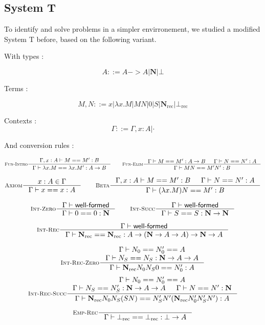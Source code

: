 \documentclass[11pt]{article}
\DeclareMathOperator{\rec}{rec}
\newcommand{\0}{\mathbf{0}}
\newcommand{\1}{\mathbf{1}}
\newcommand{\nat}{\mathbf{N}}
\newcommand{\tctx}{\Gamma}
\newcommand{\Wf}{\textsf{well-formed}}
\begin{document}


\subsection{System T}

To identify and solve problems in a simpler envirronement, we studied a modified System T before, based on the following variant.

With types :

$$ A ::= A -> A | \nat | \bot $$

Terms :

$$ M,N ::= x | \lambda x. M | MN | 0 | S | \nat_{\rec} | \bot_{\rec} $$


Contexts :
$$ \tctx ::= \tctx, x : A | \cdot $$

And conversion rules :


$$
    \inference[\textsc{Fun-Intro}]{\tctx, x : A |- M == M' : B }{\tctx |- \lambda x. M == \lambda x. M' : A -> B} \qquad
    \inference[\textsc{Fun-Elim}]{\tctx |- M == M' : A -> B& \tctx |- N == N' : A}{\tctx |- MN == M'N' : B}
$$

$$
    \inference[\textsc{Axiom}]{x : A \in \tctx }{\tctx |- x == x : A} \qquad
    \inference[\textsc{Beta}]{\tctx, x : A |- M == M' : B & \tctx |- N == N' : A}{\tctx |- (\lambda x. M)N == M' : B}
$$

$$
    \inference[\textsc{Int-Zero}]{\tctx |- \Wf}{\tctx |- 0 == 0 : \nat} \qquad
    \inference[\textsc{Int-Succ}]{\tctx |- \Wf}{\tctx |- S == S : \nat -> \nat}
$$

$$
    \inference[\textsc{Int-Rec}]{\tctx |- \Wf}{\tctx |- \nat_{\rec} == \nat_{\rec} : A \to \left(\nat -> A -> A \right) -> \nat -> A}
$$


$$
    \inference[\textsc{Int-Rec-Zero}]{\tctx |- N_0 == N'_0 == A\\ \tctx |- N_S == N_S : \nat -> A  -> A}{\tctx |- \nat_{\rec} N_0N_S0 == N'_0 : A}
$$
$$
    \inference[\textsc{Int-Rec-Succ}]{\tctx |- N_0 == N'_0 == A\\ \tctx |- N_S == N'_S : \nat -> A  -> A & \tctx |- N == N' :\nat}{\tctx |- \nat_{\rec} N_0N_S (S N) == N'_S N' (\nat_{\rec}N'_0 N'_S N') : A}
$$


$$
    \inference[\textsc{Emp-Rec}]{}{\tctx |- \bot_{\rec} == \bot_{\rec} : \bot -> A}
$$
\end{document}
